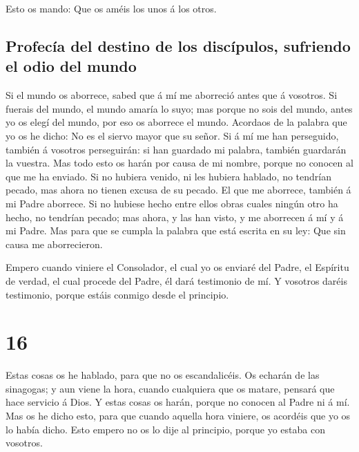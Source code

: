  Esto os mando: Que os améis los unos á los otros.

\hypertarget{profecuxeda-del-destino-de-los-discuxedpulos-sufriendo-el-odio-del-mundo}{%
\subsection{Profecía del destino de los discípulos, sufriendo el odio
del
mundo}\label{profecuxeda-del-destino-de-los-discuxedpulos-sufriendo-el-odio-del-mundo}}

 Si el mundo os aborrece, sabed que á mí me aborreció antes
que á vosotros.  Si fuerais del mundo, el mundo amaría lo
suyo; mas porque no sois del mundo, antes yo os elegí del mundo, por eso
os aborrece el mundo.  Acordaos de la palabra que yo os he
dicho: No es el siervo mayor que su señor. Si á mí me han perseguido,
también á vosotros perseguirán: si han guardado mi palabra, también
guardarán la vuestra.  Mas todo esto os harán por causa de
mi nombre, porque no conocen al que me ha enviado.  Si no
hubiera venido, ni les hubiera hablado, no tendrían pecado, mas ahora no
tienen excusa de su pecado.  El que me aborrece, también á
mi Padre aborrece.  Si no hubiese hecho entre ellos obras
cuales ningún otro ha hecho, no tendrían pecado; mas ahora, y las han
visto, y me aborrecen á mí y á mi Padre.  Mas para que se
cumpla la palabra que está escrita en su ley: Que sin causa me
aborrecieron.

 Empero cuando viniere el Consolador, el cual yo os enviaré
del Padre, el Espíritu de verdad, el cual procede del Padre, él dará
testimonio de mí.  Y vosotros daréis testimonio, porque
estáis conmigo desde el principio.

\hypertarget{section-15}{%
\section{16}\label{section-15}}

 Estas cosas os he hablado, para que no os escandalicéis.
 Os echarán de las sinagogas; y aun viene la hora, cuando
cualquiera que os matare, pensará que hace servicio á Dios. 
Y estas cosas os harán, porque no conocen al Padre ni á mí. 
Mas os he dicho esto, para que cuando aquella hora viniere, os acordéis
que yo os lo había dicho. Esto empero no os lo dije al principio, porque
yo estaba con vosotros.

